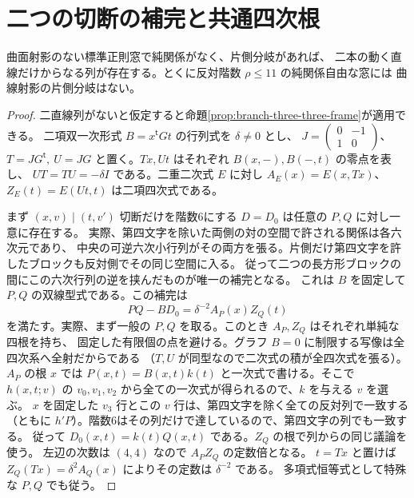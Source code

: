 \section{二つの切断の補完と共通四次根}
\label{sec:branch-pencil-resultant}
\begin{theorem}\label{thm:branch-pencil-resultant}
曲面射影のない標準正則窓で純関係がなく、片側分岐があれば、
二本の動く直線だけからなる列が存在する。とくに反対階数 $\rho\le11$ の純関係自由な窓には
曲線射影の片側分岐はない。
\end{theorem}
\begin{proof}
二直線列がないと仮定すると命題\ref{prop:branch-three-three-frame}が適用できる。
二項双一次形式 $B=x^{\mathsf t}Gt$ の行列式を $\delta\ne0$ とし、
$J=\left(\begin{smallmatrix}0&-1\\1&0\end{smallmatrix}\right)$、
$T=JG^{\mathsf t},\ U=JG$ と置く。$Tx,Ut$ はそれぞれ $B(x,-), B(-,t)$ の零点を表し、
$UT=TU=-\delta I$ である。二重二次式 $E$ に対し
$A_E(x)=E(x,Tx)$、$Z_E(t)=E(Ut,t)$ は二項四次式である。

まず $(x,v)\mid(t,v')$ 切断だけを階数6にする $D=D_0$ は任意の $P,Q$ に対し一意に存在する。
実際、第四文字を除いた両側の対の空間で許される関係は各六次元であり、
中央の可逆六次小行列がその両方を張る。片側だけ第四文字を許したブロックも反対側でその同じ空間に入る。
従って二つの長方形ブロックの間にこの六次行列の逆を挟んだものが唯一の補完となる。
これは $B$ を固定して $P,Q$ の双線型式である。この補完は
\begin{equation}\label{eq:branch-complete-product}
             PQ-BD_0=\delta^{-2}A_P(x) Z_Q(t)
\end{equation}
を満たす。実際、まず一般の $P,Q$ を取る。このとき $A_P,Z_Q$ はそれぞれ単純な四根を持ち、
固定した有限個の点を避ける。グラフ $B=0$ に制限する写像は全四次系へ全射だからである
（$T,U$ が同型なので二次式の積が全四次式を張る）。
$A_P$ の根 $x$ では $P(x,t)=B(x,t)k(t)$ と一次式で書ける。そこで
$h(x,t;v)$ の $v_0,v_1,v_2$ から全ての一次式が得られるので、$k$ を与える $v$ を選ぶ。
$x$ を固定した $v_3$ 行とこの $v$ 行は、第四文字を除く全ての反対列で一致する
（ともに $h'P$）。階数6はその列だけで達しているので、第四文字の列でも一致する。
従って $D_0(x,t)=k(t)Q(x,t)$ である。$Z_Q$ の根で列からの同じ議論を使う。
左辺の次数は $(4,4)$ なので $A_P Z_Q$ の定数倍となる。
$t=Tx$ と置けば $Z_Q(Tx)=\delta^2 A_Q(x)$ によりその定数は $\delta^{-2}$ である。
多項式恒等式として特殊な $P,Q$ でも従う。


\end{proof}
